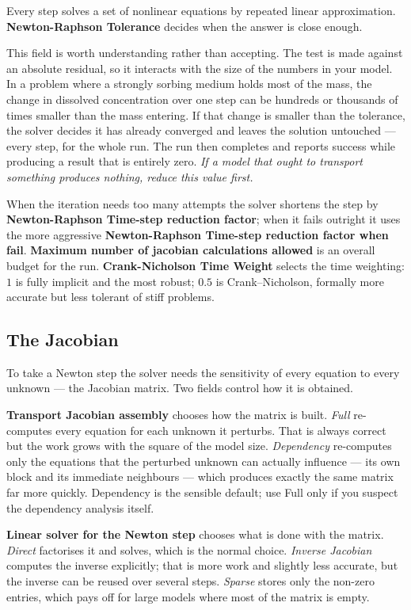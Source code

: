 Every step solves a set of nonlinear equations by repeated linear
approximation. \textbf{Newton-Raphson Tolerance} decides when the answer is
close enough.

This field is worth understanding rather than accepting. The test is made
against an absolute residual, so it interacts with the size of the numbers in
your model. In a problem where a strongly sorbing medium holds most of the mass,
the change in dissolved concentration over one step can be hundreds or thousands
of times smaller than the mass entering. If that change is smaller than the
tolerance, the solver decides it has already converged and leaves the solution
untouched --- every step, for the whole run. The run then completes and reports
success while producing a result that is entirely zero. \emph{If a model that
ought to transport something produces nothing, reduce this value first.}

When the iteration needs too many attempts the solver shortens the step by
\textbf{Newton-Raphson Time-step reduction factor}; when it fails outright it
uses the more aggressive \textbf{Newton-Raphson Time-step reduction factor when
fail}. \textbf{Maximum number of jacobian calculations allowed} is an overall
budget for the run. \textbf{Crank-Nicholson Time Weight} selects the time
weighting: $1$ is fully implicit and the most robust; $0.5$ is
Crank--Nicholson, formally more accurate but less tolerant of stiff problems.

\subsection{The Jacobian}

To take a Newton step the solver needs the sensitivity of every equation to
every unknown --- the Jacobian matrix. Two fields control how it is obtained.

\textbf{Transport Jacobian assembly} chooses how the matrix is built.
\emph{Full} re-computes every equation for each unknown it perturbs. That is
always correct but the work grows with the square of the model size.
\emph{Dependency} re-computes only the equations that the perturbed unknown can
actually influence --- its own block and its immediate neighbours --- which
produces exactly the same matrix far more quickly. Dependency is the sensible
default; use Full only if you suspect the dependency analysis itself.

\textbf{Linear solver for the Newton step} chooses what is done with the
matrix. \emph{Direct} factorises it and solves, which is the normal choice.
\emph{Inverse Jacobian} computes the inverse explicitly; that is more work and
slightly less accurate, but the inverse can be reused over several steps.
\emph{Sparse} stores only the non-zero entries, which pays off for large models
where most of the matrix is empty.

